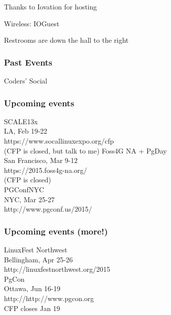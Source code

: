 \documentclass{beamer}
\begin{document}

\frame
{
  \begin{center}
  \item[]Thanks to Iovation for hosting
  \item[]Wireless: IOGuest
  \item[]Restrooms are down the hall to the right
  \end{center}
}

\frame
{
  \frametitle{Past Events}
  \begin{center}
{\large Coders' Social\\}
  \end{center}
}

\frame
{
  \frametitle{Upcoming events}
  \begin{center}
{\large SCALE13x\\}
LA, Feb 19-22\\
https://www.socallinuxexpo.org/cfp\\
(CFP is closed, but talk to me)
\vspace{5 mm}
{\large Foss4G NA + PgDay\\}
San Francisco, Mar 9-12\\
https://2015.foss4g-na.org/\\
(CFP is closed)\\
\vspace{5 mm}
{\large PGConfNYC\\}
NYC, Mar 25-27\\
http://www.pgconf.us/2015/\\
  \end{center}
}

\frame
{
  \frametitle{Upcoming events (more!)}
  \begin{center}
{\large LinuxFest Northwest\\}
Bellingham, Apr 25-26\\
http://linuxfestnorthwest.org/2015\\
\vspace{5 mm}
{\large PgCon\\}
Ottawa, Jun 16-19\\
http://http://www.pgcon.org\\
CFP closes Jan 19
  \end{center}
}
\end{document}
